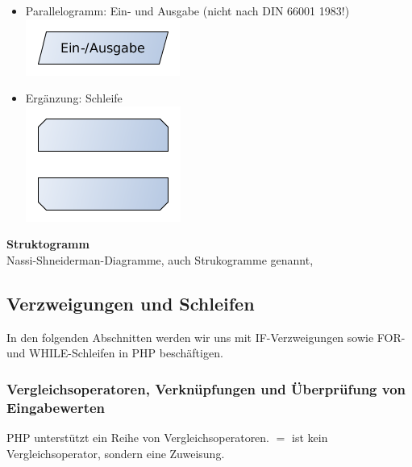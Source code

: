 \begin{itemize}
	\item Parallelogramm: Ein- und Ausgabe (nicht nach DIN 66001 1983!)\\
		\includegraphics[scale=0.5]{pictures/lf06prog-pic/lf06prog-pap-ein-ausgabe.png}	
	\item Ergänzung: Schleife\\
		\includegraphics[scale=0.5]{pictures/lf06prog-pic/lf06prog-pap-schleife.png}
\end{itemize}

{\bf Struktogramm}~\\

Nassi-Shneiderman-Diagramme, auch Strukogramme genannt, 



\subsection{Verzweigungen und Schleifen}

In den folgenden Abschnitten werden wir uns mit IF-Verzweigungen sowie FOR- und WHILE-Schleifen in PHP beschäftigen. 

\subsubsection{Vergleichsoperatoren, Verknüpfungen und Überprüfung von Eingabewerten}

PHP unterstützt ein Reihe von Vergleichsoperatoren. $=$ ist kein Vergleichsoperator, sondern eine Zuweisung.

